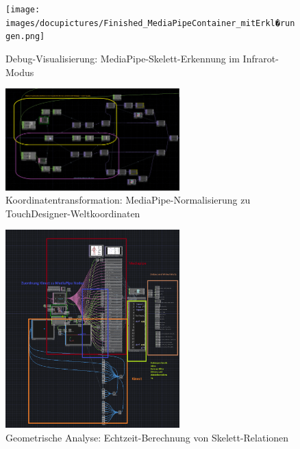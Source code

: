 \begin{figure}[!htbp]
    \centering
    \texttt{[image: images/docupictures/Finished\_MediaPipeContainer\_mitErkl�rungen.png]}
    \caption{Debug-Visualisierung: MediaPipe-Skelett-Erkennung im Infrarot-Modus}
    \label{fig:debug_circles}
\end{figure}

\begin{figure}[!htbp]
    \centering
    \includegraphics[width=0.6\textwidth,height=0.25\textheight,keepaspectratio]{images/docupictures/NodeXYzuSOPZentriertemTranslate.png}
    \caption{Koordinatentransformation: MediaPipe-Normalisierung zu TouchDesigner-Weltkoordinaten}
    \label{fig:coordinate_transform}
\end{figure}

\begin{figure}[!htbp]
    \centering
    \includegraphics[width=0.6\textwidth,height=0.25\textheight,keepaspectratio]{images/docupictures/KinectMediaPipe_Testing.png}
    \caption{Geometrische Analyse: Echtzeit-Berechnung von Skelett-Relationen}
    \label{fig:distance_angle}
\end{figure}

